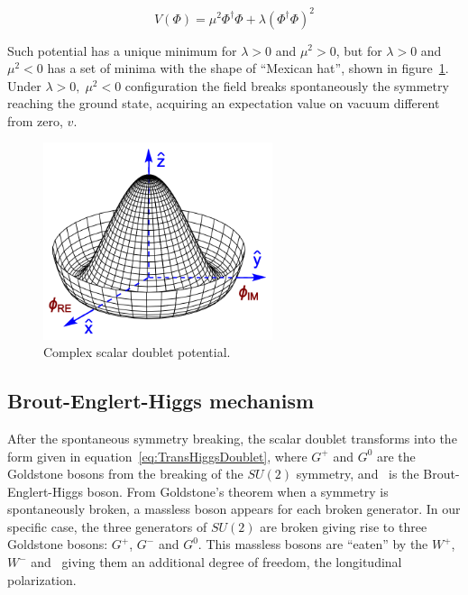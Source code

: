 \begin{equation}
  \label{eq:HiggsPotential}
  V(\Phi)=\mu^{2}\Phi^{\dagger}\Phi+\lambda(\Phi^{\dagger}\Phi)^{2}
\end{equation}

Such potential has a unique minimum for $\lambda>0$ and $\mu^{2}>0$, but for $\lambda>0$ and $\mu^{2}<0$ has a set of minima with the shape of ``Mexican hat'', shown in figure~\ref{fig:MexicanHat}. Under $\lambda>0,\;\mu^{2}<0$ configuration the field breaks spontaneously the symmetry reaching the ground state, acquiring an expectation value on vacuum different from zero, $v$. 

\begin{figure}[!Hhtbp]
  \begin{center}
    \includegraphics[width=0.6\textwidth]{figs/Mexican_hat.png}
    \caption{Complex scalar doublet potential.}
    \label{fig:MexicanHat}
  \end{center}
\end{figure}

\subsection{Brout-Englert-Higgs mechanism}
\label{sec:higgs}

After the spontaneous symmetry breaking, the scalar doublet transforms into the form given in equation~\ref{eq:TransHiggsDoublet}, where $G^{+}$ and $G^{0}$ are the Goldstone bosons from the breaking of the $SU(2)$ symmetry, and \Hb~is the Brout-Englert-Higgs boson. From Goldstone's theorem when a symmetry is spontaneously broken, a massless boson appears for each broken generator. In our specific case, the three generators of $SU(2)$ are broken giving rise to three Goldstone bosons: $G^{+}$, $G^{-}$ and $G^{0}$. This massless bosons are ``eaten'' by the $W^{+}$, $W^{-}$ and \Z~giving them an additional degree of freedom, the longitudinal polarization. 

